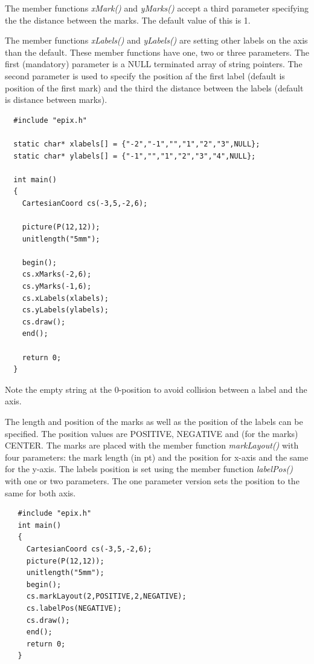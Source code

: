 \documentclass[12pt,a4paper]{article}
\begin{document}
  The member functions \textit{xMark()} and \textit{yMarks()} accept a third
  parameter spe\-ci\-fying the the distance between the marks. The default value
  of this is 1.

  The member functions \textit{xLabels()} and \textit{yLabels()} are setting
  other labels on the axis than the default. These member functions have one,
  two or three parameters. The first (mandatory) parameter is a NULL
  ter\-mi\-na\-ted array of string pointers. The second parameter is used to
  specify the position af the first label (default is position of the first
  mark) and the third the distance between the labels (default is distance
  between marks).

  \begin{minipage}[c]{7.5cm}
    \begin{lstlisting}
  #include "epix.h"

  static char* xlabels[] = {"-2","-1","","1","2","3",NULL};
  static char* ylabels[] = {"-1","","1","2","3","4",NULL};

  int main()
  {
    CartesianCoord cs(-3,5,-2,6);

    picture(P(12,12));
    unitlength("5mm");

    begin();
    cs.xMarks(-2,6);
    cs.yMarks(-1,6);
    cs.xLabels(xlabels);
    cs.yLabels(ylabels);
    cs.draw();
    end();

    return 0;
  }
    \end{lstlisting}
  \end{minipage}
  \begin{minipage}{5.5cm}
    \vspace{5pc}
      
  \end{minipage}

  Note the empty string at the 0-position to avoid collision between a label
  and the axis.

  The length and position of the marks as well as the position of the labels can
  be specified. The position values are POSITIVE, NEGATIVE and (for the marks)
  CENTER. The marks are placed with the member function \textit{markLayout()}
  with four parameters: the mark length (in pt) and the position for x-axis
  and the same for the y-axis. The labels position is set using the member
  function \textit{labelPos()} with one or two parameters. The one parameter
  version sets the position to the same for both axis.

  \begin{minipage}{7.5cm}
    \begin{lstlisting}
   #include "epix.h"
   int main()
   {
     CartesianCoord cs(-3,5,-2,6);
     picture(P(12,12));
     unitlength("5mm");
     begin();
     cs.markLayout(2,POSITIVE,2,NEGATIVE);
     cs.labelPos(NEGATIVE);
     cs.draw();
     end();
     return 0;
   }
    \end{lstlisting}
  \end{minipage}
  \begin{minipage}{5.5cm}
    
  \end{minipage}
\end{document}
